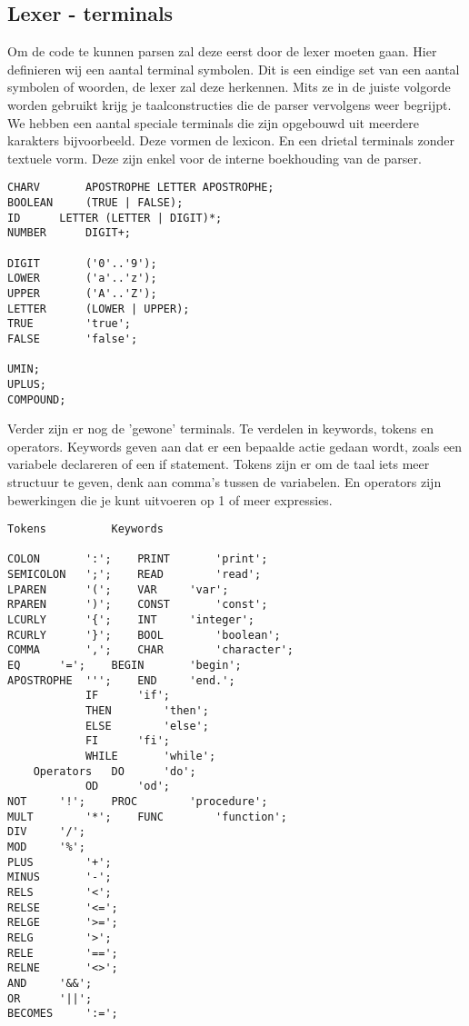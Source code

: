 \documentclass[]{article}
\begin{document}
\subsection{Lexer - terminals}
Om de code te kunnen parsen zal deze eerst door de lexer moeten gaan. Hier definieren wij een aantal terminal symbolen. Dit is een eindige set van een aantal symbolen of woorden, de lexer zal deze herkennen. Mits ze in de juiste volgorde worden gebruikt krijg je taalconstructies die de parser vervolgens weer begrijpt. We hebben een aantal speciale terminals die zijn opgebouwd uit meerdere karakters bijvoorbeeld. Deze vormen de lexicon. En een drietal terminals zonder textuele vorm. Deze zijn enkel voor de interne boekhouding van de parser.
\\
\begin{lstlisting}[style=ANTLR]
CHARV		APOSTROPHE LETTER APOSTROPHE;
BOOLEAN		(TRUE | FALSE);
ID		LETTER (LETTER | DIGIT)*;
NUMBER		DIGIT+;
	
DIGIT		('0'..'9');
LOWER		('a'..'z');
UPPER		('A'..'Z');
LETTER		(LOWER | UPPER);
TRUE		'true';
FALSE		'false';

UMIN;
UPLUS;
COMPOUND;			
\end{lstlisting}

\newpage 

Verder zijn er nog de 'gewone' terminals. Te verdelen in keywords, tokens en operators. Keywords geven aan dat er een bepaalde actie gedaan wordt, zoals een variabele declareren of een if statement. Tokens zijn er om de taal iets meer structuur te geven, denk aan comma's tussen de variabelen. En operators zijn bewerkingen die je kunt uitvoeren op 1 of meer expressies.
\\
\begin{lstlisting}[style=ANTLR]
	Tokens			Keywords
	
COLON		':';	PRINT		'print';
SEMICOLON	';';	READ		'read';
LPAREN		'(';	VAR		'var';
RPAREN		')';	CONST		'const';
LCURLY		'{';	INT		'integer';
RCURLY		'}';	BOOL		'boolean';
COMMA		',';	CHAR		'character';
EQ		'=';	BEGIN		'begin';
APOSTROPHE	''';	END		'end.';
			IF		'if';
			THEN		'then';
			ELSE		'else';
			FI		'fi';
			WHILE		'while';
	Operators	DO		'do';
			OD		'od';
NOT		'!';	PROC		'procedure';
MULT		'*';	FUNC		'function';
DIV		'/';
MOD		'%';
PLUS		'+';
MINUS		'-';
RELS		'<';
RELSE		'<=';
RELGE		'>=';
RELG		'>';
RELE		'==';
RELNE		'<>';
AND		'&&';
OR		'||';
BECOMES		':=';
\end{lstlisting}
\newpage
\end{document}
